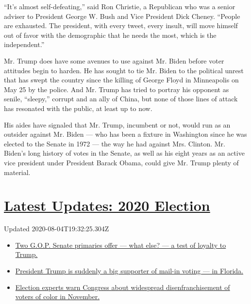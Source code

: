 ``It's almost self-defeating,'' said Ron Christie, a Republican who was
a senior adviser to President George W. Bush and Vice President Dick
Cheney. ``People are exhausted. The president, with every tweet, every
insult, will move himself out of favor with the demographic that he
needs the most, which is the independent.''

Mr. Trump does have some avenues to use against Mr. Biden before voter
attitudes begin to harden. He has sought to tie Mr. Biden to the
political unrest that has swept the country since the killing of George
Floyd in Minneapolis on May 25 by the police. And Mr. Trump has tried to
portray his opponent as senile, ``sleepy,'' corrupt and an ally of
China, but none of those lines of attack has resonated with the public,
at least up to now.

His aides have signaled that Mr. Trump, incumbent or not, would run as
an outsider against Mr. Biden --- who has been a fixture in Washington
since he was elected to the Senate in 1972 --- the way he had against
Mrs. Clinton. Mr. Biden's long history of votes in the Senate, as well
as his eight years as an active vice president under President Barack
Obama, could give Mr. Trump plenty of material.

\hypertarget{latest-updates-2020-election}{%
\section{\texorpdfstring{\href{https://www.nytimes3xbfgragh.onion/2020/08/04/us/elections/primary-election-michigan-arizona-kansas.html?action=click\&pgtype=Article\&state=default\&region=MAIN_CONTENT_1\&context=storylines_live_updates}{Latest
Updates: 2020
Election}}{Latest Updates: 2020 Election}}\label{latest-updates-2020-election}}

Updated 2020-08-04T19:32:25.304Z

\begin{itemize}
\tightlist
\item
  \href{https://www.nytimes3xbfgragh.onion/2020/08/04/us/elections/primary-election-michigan-arizona-kansas.html?action=click\&pgtype=Article\&state=default\&region=MAIN_CONTENT_1\&context=storylines_live_updates\#link-3924dd44}{Two
  G.O.P. Senate primaries offer --- what else? --- a test of loyalty to
  Trump.}
\item
  \href{https://www.nytimes3xbfgragh.onion/2020/08/04/us/elections/primary-election-michigan-arizona-kansas.html?action=click\&pgtype=Article\&state=default\&region=MAIN_CONTENT_1\&context=storylines_live_updates\#link-32b39e33}{President
  Trump is suddenly a big supporter of mail-in voting --- in Florida.}
\item
  \href{https://www.nytimes3xbfgragh.onion/2020/08/04/us/elections/primary-election-michigan-arizona-kansas.html?action=click\&pgtype=Article\&state=default\&region=MAIN_CONTENT_1\&context=storylines_live_updates\#link-6d019753}{Election
  experts warn Congress about widespread disenfranchisement of voters of
  color in November.}
\end{itemize}

